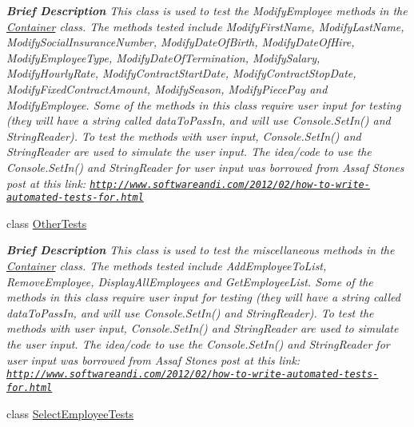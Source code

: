 \begin{DoxyCompactItemize}
\begin{DoxyCompactList}\small\item\em {\bfseries  Brief Description} This class is used to test the Modify\+Employee methods in the \hyperlink{class_the_company_1_1_container}{Container} class. The methods tested include Modify\+First\+Name, Modify\+Last\+Name, Modify\+Social\+Insurance\+Number, Modify\+Date\+Of\+Birth, Modify\+Date\+Of\+Hire, Modify\+Employee\+Type, Modify\+Date\+Of\+Termination, Modify\+Salary, Modify\+Hourly\+Rate, Modify\+Contract\+Start\+Date, Modify\+Contract\+Stop\+Date, Modify\+Fixed\+Contract\+Amount, Modify\+Season, Modify\+Piece\+Pay and Modify\+Employee. Some of the methods in this class require user input for testing (they will have a string called data\+To\+Pass\+In, and will use Console.\+Set\+In() and String\+Reader). To test the methods with user input, Console.\+Set\+In() and String\+Reader are used to simulate the user input. The idea/code to use the Console.\+Set\+In() and String\+Reader for user input was borrowed from Assaf Stone\textquotesingle{}s post at this link\+: \href{http://www.softwareandi.com/2012/02/how-to-write-automated-tests-for.html}{\tt http\+://www.\+softwareandi.\+com/2012/02/how-\/to-\/write-\/automated-\/tests-\/for.\+html} \end{DoxyCompactList}\item 
class \hyperlink{class_the_company_1_1_tests_1_1_other_tests}{Other\+Tests}
\begin{DoxyCompactList}\small\item\em {\bfseries  Brief Description} This class is used to test the miscellaneous methods in the \hyperlink{class_the_company_1_1_container}{Container} class. The methods tested include Add\+Employee\+To\+List, Remove\+Employee, Display\+All\+Employees and Get\+Employee\+List. Some of the methods in this class require user input for testing (they will have a string called data\+To\+Pass\+In, and will use Console.\+Set\+In() and String\+Reader). To test the methods with user input, Console.\+Set\+In() and String\+Reader are used to simulate the user input. The idea/code to use the Console.\+Set\+In() and String\+Reader for user input was borrowed from Assaf Stone\textquotesingle{}s post at this link\+: \href{http://www.softwareandi.com/2012/02/how-to-write-automated-tests-for.html}{\tt http\+://www.\+softwareandi.\+com/2012/02/how-\/to-\/write-\/automated-\/tests-\/for.\+html} \end{DoxyCompactList}\item 
class \hyperlink{class_the_company_1_1_tests_1_1_select_employee_tests}{Select\+Employee\+Tests}

\end{DoxyCompactItemize}
